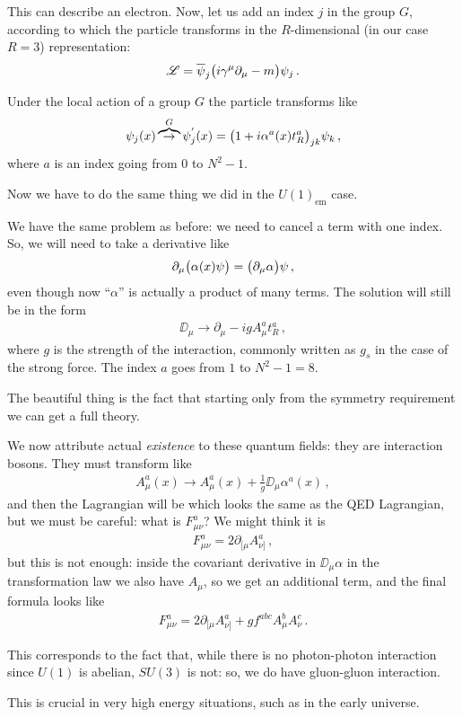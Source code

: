 \documentclass[main.tex]{subfiles}
\begin{document}
This can describe an electron. Now, let us add an index \(j\) in the group \(G\), according to which the particle transforms in the \(R\)-dimensional (in our case \(R=3\)) representation:
\begin{align}
\mathscr{L} = \overline{\psi}_{j} \qty(i \gamma^{\mu } \partial_{\mu } - m ) \psi_{j}
\,.
\end{align}

Under the local action of a group \(G\) the particle transforms like 
%
\begin{align}
\psi_{j} (x) \overbrace{\to}^{G} 
\psi^{'}_{j} (x)
= \qty(1 + i \alpha^{a}(x) t^{a}_{R})_{jk} \psi_{k} 
\,,
\end{align}
%
where \(a\) is an index going from 0 to \(N^2-1\). 

Now we have to do the same thing we did in the \(U(1)_{\text{em}}\) case. 

We have the same problem as before: we need to cancel a term with one index. So, we will need to take a derivative like 
%
\begin{align}
\partial_{\mu } \qty(\alpha (x) \psi ) = \qty(\partial_{\mu } \alpha ) \psi  
\,,
\end{align}
%
even though now ``\(\alpha \)'' is actually a product of many terms. The solution will still be in the form 
%
\begin{align}
\DD_{\mu } \to \partial_{\mu } - i g A_{\mu }^{a} t^{a}_{R}
\,,
\end{align}
%
where \(g\) is the strength of the interaction, commonly written as \(g_{s}\) in the case of the strong force. 
The index \(a\) goes from \(1\) to \(N^2-1 = 8\). 

The beautiful thing is the fact that starting only from the symmetry requirement we can get a full theory. 

We now attribute actual \emph{existence} to these quantum fields: they are interaction bosons. 
They must transform like 
%
\begin{align}
A^{a}_{\mu }(x) \to A^{a}_{\mu } (x) + \frac{1}{g} \DD_{\mu } \alpha^{a}(x)
\,,
\end{align}
%
and then the Lagrangian will be 
%
%
which looks the same as the QED Lagrangian, but we must be careful: what is \(F_{\mu \nu }^{a}\)? We might think it is 
%
\begin{align}
F^{a}_{\mu \nu } = 2 \partial_{[\mu } A^{a}_{\nu ]}
\,,
\end{align}
%
but this is not enough: inside the covariant derivative in \(\DD_{\mu } \alpha \) in the transformation law we also have \(A_{\mu }\), so we get an additional term, and the final formula looks like 
%
\begin{align}
F^{a}_{\mu \nu } = 2 \partial_{[\mu } A^{a}_{\nu ]} + g f^{abc} A^{b}_{\mu } A^{c}_{\nu }
\,.
\end{align}

This corresponds to the fact that, while there is no photon-photon interaction since \(U(1)\) is abelian,  \(SU(3)\) is not: so, we do have gluon-gluon interaction. 

This is crucial in very high energy situations, such as in the early universe. 
\end{document}

